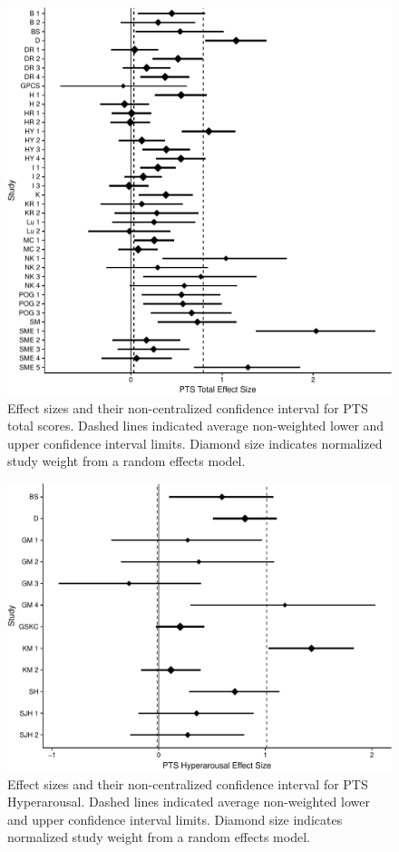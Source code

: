\documentclass[english,man, mask]{apa6}
\theoremstyle{definition}
\theoremstyle{definition}
\theoremstyle{definition}
\theoremstyle{remark}
\begin{document}
\begin{figure}[htbp]
\centering
\includegraphics{meta_markdown_files/figure-latex/ptspicoverall-1.pdf}
\caption{\label{fig:ptspicoverall}Effect sizes and their non-centralized
confidence interval for PTS total scores. Dashed lines indicated average
non-weighted lower and upper confidence interval limits. Diamond size
indicates normalized study weight from a random effects model.}
\end{figure}

\begin{figure}[htbp]
\centering
\includegraphics{meta_markdown_files/figure-latex/ptspichyper-1.pdf}
\caption{\label{fig:ptspichyper}Effect sizes and their non-centralized
confidence interval for PTS Hyperarousal. Dashed lines indicated average
non-weighted lower and upper confidence interval limits. Diamond size
indicates normalized study weight from a random effects model.}
\end{figure}
\end{document}
